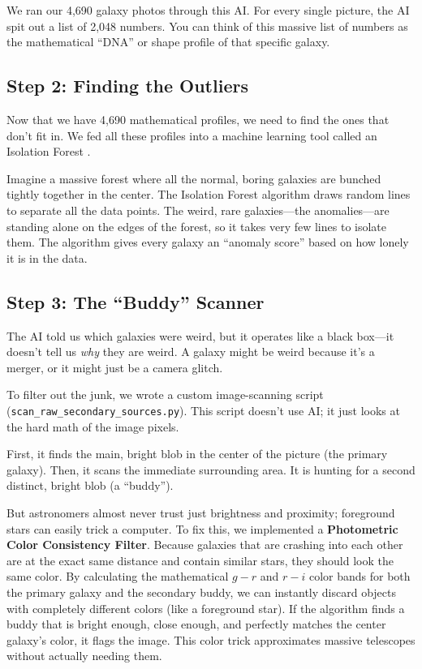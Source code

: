 \documentclass[twocolumn]{aastex631}
\begin{document}
We ran our 4,690 galaxy photos through this AI. For every single picture, the AI spit out a list of 2,048 numbers. You can think of this massive list of numbers as the mathematical ``DNA'' or shape profile of that specific galaxy. 

\subsection{Step 2: Finding the Outliers}
Now that we have 4,690 mathematical profiles, we need to find the ones that don't fit in. We fed all these profiles into a machine learning tool called an Isolation Forest \citep{liu2008}. 

Imagine a massive forest where all the normal, boring galaxies are bunched tightly together in the center. The Isolation Forest algorithm draws random lines to separate all the data points. The weird, rare galaxies—the anomalies—are standing alone on the edges of the forest, so it takes very few lines to isolate them. The algorithm gives every galaxy an ``anomaly score'' based on how lonely it is in the data.

\subsection{Step 3: The ``Buddy'' Scanner}
The AI told us which galaxies were weird, but it operates like a black box—it doesn't tell us \textit{why} they are weird. A galaxy might be weird because it's a merger, or it might just be a camera glitch.

To filter out the junk, we wrote a custom image-scanning script (\texttt{scan\_raw\_secondary\_sources.py}). This script doesn't use AI; it just looks at the hard math of the image pixels. 

First, it finds the main, bright blob in the center of the picture (the primary galaxy). Then, it scans the immediate surrounding area. It is hunting for a second distinct, bright blob (a ``buddy''). 

But astronomers almost never trust just brightness and proximity; foreground stars can easily trick a computer. To fix this, we implemented a \textbf{Photometric Color Consistency Filter}. Because galaxies that are crashing into each other are at the exact same distance and contain similar stars, they should look the same color. By calculating the mathematical $g-r$ and $r-i$ color bands for both the primary galaxy and the secondary buddy, we can instantly discard objects with completely different colors (like a foreground star). If the algorithm finds a buddy that is bright enough, close enough, and perfectly matches the center galaxy's color, it flags the image. This color trick approximates massive telescopes without actually needing them.
\end{document}
